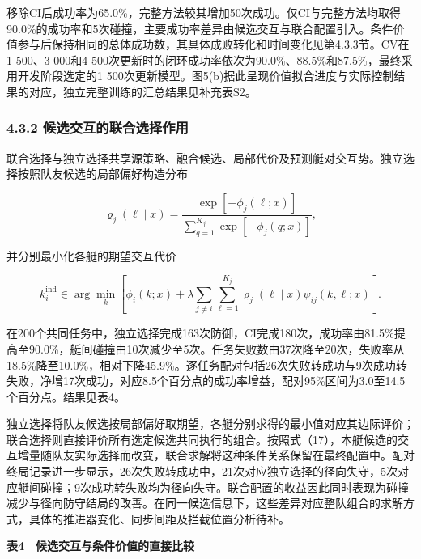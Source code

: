 \documentclass[UTF8,a4paper,zihao=5,fontset=none]{ctexart}
\begin{document}
移除CI后成功率为65.0\%，完整方法较其增加50次成功。仅CI与完整方法均取得90.0\%的成功率和5次碰撞，主要成功率差异由候选交互与联合配置引入。条件价值参与后保持相同的总体成功数，其具体成败转化和时间变化见第4.3.3节。CV在1 500、3 000和4 500次更新时的闭环成功率依次为90.0\%、88.5\%和87.5\%，最终采用开发阶段选定的1 500次更新模型。图5(b)据此呈现价值拟合进度与实际控制结果的对应，独立完整训练的汇总结果见补充表S2。

\subsubsection*{4.3.2 候选交互的联合选择作用}

联合选择与独立选择共享源策略、融合候选、局部代价及预测艇对交互势。独立选择按照队友候选的局部偏好构造分布

\[
\varrho_j(\ell\mid x)
=\frac{\exp[-\phi_j(\ell;x)]}
{\sum_{q=1}^{K_j}\exp[-\phi_j(q;x)]},
\tag{39}
\]

并分别最小化各艇的期望交互代价

\[
k_i^{\mathrm{ind}}\in\arg\min_k
\left[\phi_i(k;x)+\lambda\sum_{j\ne i}\sum_{\ell=1}^{K_j}
\varrho_j(\ell\mid x)\psi_{ij}(k,\ell;x)\right].
\tag{40}
\]

在200个共同任务中，独立选择完成163次防御，CI完成180次，成功率由81.5\%提高至90.0\%，艇间碰撞由10次减少至5次。任务失败数由37次降至20次，失败率从18.5\%降至10.0\%，相对下降45.9\%。逐任务配对包括26次失败转成功与9次成功转失败，净增17次成功，对应8.5个百分点的成功率增益，配对95\%区间为3.0至14.5个百分点。结果见表4。

独立选择将队友候选按局部偏好取期望，各艇分别求得的最小值对应其边际评价；联合选择则直接评价所有选定候选共同执行的组合。按照式（17），本艇候选的交互增量随队友实际选择而改变，联合求解将这种条件关系保留在最终配置中。配对终局记录进一步显示，26次失败转成功中，21次对应独立选择的径向失守，5次对应艇间碰撞；9次成功转失败均为径向失守。联合配置的收益因此同时表现为碰撞减少与径向防守结局的改善。在同一候选信息下，这些差异对应整队组合的求解方式，具体的推进器变化、同步间距及拦截位置分析\textcolor{PendingRed}{待补}。

\begin{center}\small\bfseries 表4　候选交互与条件价值的直接比较\end{center}
\end{document}
